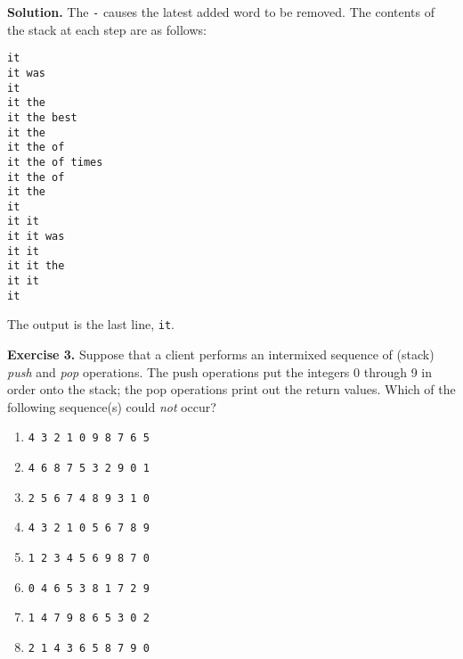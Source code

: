 \documentclass[12pt, a4paper]{article}
\newenvironment{ex}[2][Exercise]
{\par\medskip\noindent \textbf{#1 #2.}}
{\medskip}
\newenvironment{sol}[1][Solution]
{\par\medskip\noindent \textbf{#1.} }
{\medskip}
\begin{document}
	\begin{sol}
		The \texttt{-} causes the latest added word to be removed. The contents
		of the stack at each step are as follows:
		\begin{lstlisting}
it
it was
it
it the
it the best
it the
it the of
it the of times
it the of
it the
it
it it
it it was
it it
it it the
it it
it
		\end{lstlisting}
		The output is the last line, \texttt{it}.
	\end{sol}
	\begin{ex}{3}
		Suppose that a client performs an intermixed sequence of (stack) \emph{push} and
		\emph{pop} operations. The push operations put the integers 0 through 9 in order
		onto the stack; the pop operations print out the return values. Which of the following sequence(s) could \emph{not} occur?
		\begin{enumerate}[label=(\alph*)]
			\item \texttt{4 3 2 1 0 9 8 7 6 5}
			\item \texttt{4 6 8 7 5 3 2 9 0 1}
			\item \texttt{2 5 6 7 4 8 9 3 1 0}
			\item \texttt{4 3 2 1 0 5 6 7 8 9}
			\item \texttt{1 2 3 4 5 6 9 8 7 0}
			\item \texttt{0 4 6 5 3 8 1 7 2 9}
			\item \texttt{1 4 7 9 8 6 5 3 0 2}
			\item \texttt{2 1 4 3 6 5 8 7 9 0}
		\end{enumerate}
	\end{ex}
\end{document}

